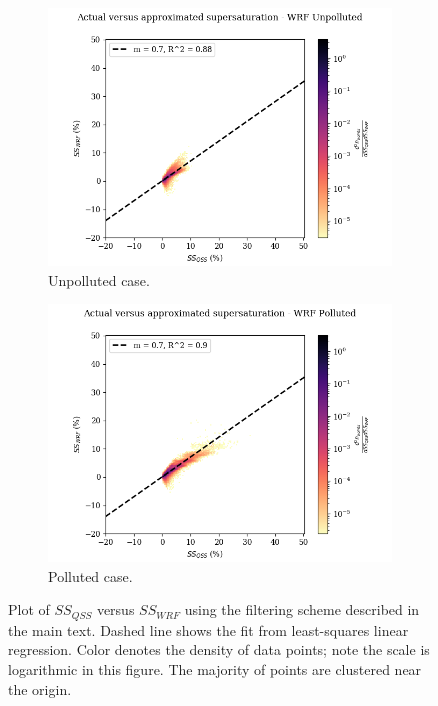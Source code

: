 \documentclass{article}
\begin{document}
\begin{figure}[ht]
	\centering
	\begin{subfigure}{0.7\textwidth}
		\includegraphics[width=\textwidth]{wrf/heatmap_ss_qss_vs_ss_wrf_Unpolluted_figure.png}
		\caption{Unpolluted case.}
		\label{wrfvsqssunpoll}
	\end{subfigure}
	\begin{subfigure}{0.7\textwidth}
		\includegraphics[width=\textwidth]{wrf/heatmap_ss_qss_vs_ss_wrf_Polluted_figure.png}
		\caption{Polluted case.}
		\label{wrfvsqsspoll}
	\end{subfigure}
	\caption{Plot of $SS_{QSS}$ versus $SS_{WRF}$ using the filtering scheme described in the main text. Dashed line shows the fit from least-squares linear regression. Color denotes the density of data points; note the scale is logarithmic in this figure. The majority of points are clustered near the origin.}
	\label{wrfvsqss}
\end{figure}
\end{document}

